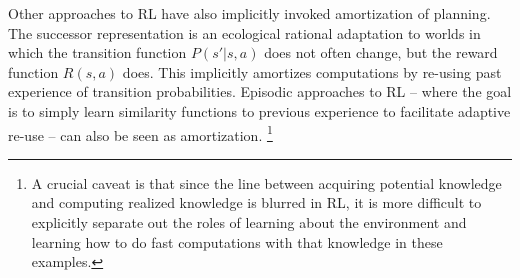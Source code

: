 Other approaches to RL have also implicitly invoked amortization of planning. The successor representation is an ecological rational adaptation to worlds in which the transition function $P(s' | s, a)$ does not often change, but the reward function $R(s, a)$ does. This implicitly amortizes computations by re-using past experience of transition probabilities. Episodic approaches to RL -- where the goal is to simply learn similarity functions to previous experience to facilitate adaptive re-use -- can also be seen as amortization. \footnote{A crucial caveat is that since the line between acquiring potential knowledge and computing realized knowledge is blurred in RL, it is more difficult to explicitly separate out the roles of learning about the environment and learning how to do fast computations with that knowledge in these examples.}




